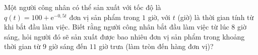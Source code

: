    \begin{ex}%
    Một người công nhân có thể sản xuất với tốc độ là\\
    $q(t)=100+\mathrm{e}^{-0{,}5t}$ đơn vị sản phẩm trong $1$ giờ, với $t$ (giờ) là thời gian tính từ khi bắt đầu làm việc. Biết rằng người công nhân bắt đầu làm việc từ lúc $8$ giờ sáng, hỏi người đó sẽ sản xuất được bao nhiêu đơn vị sản phẩm trong khoảng thời gian từ $9$ giờ sáng đến $11$ giờ trưa (làm tròn đến hàng đơn vị)?
\end{ex}

